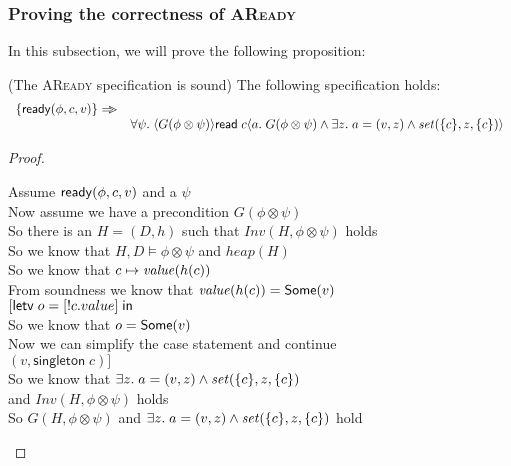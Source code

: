 \subsubsection{Proving the correctness of \textsc{AReady}}

In this subsection, we will prove the following proposition: 

\begin{prop*}{(The \textsc{AReady} specification is sound)}
The following specification holds: 
\begin{displaymath}
\begin{array}{ll}
  \{{\mathsf{ready}({\phi}, {c}, {v})}\} \Rightarrow\!\!\!> \\
& \forall \psi.\; \langle{G(\phi \otimes \psi)}\rangle{\mathsf{read}\;c}\langle{a}.\;{G(\phi \otimes \psi) \land \exists z.\;a = (v, z) \land \mathit{set}(\{{c}\}, z, \{{c}\})}\rangle 
\end{array}
\end{displaymath}
\end{prop*}

\begin{proof}
\begin{tabbedproof}
\oo Assume $\mathsf{ready}({\phi}, {c}, {v})$ and a $\psi$ \\
\ooo Now assume we have a precondition $G(\phi \otimes \psi)$ \\
\ooo So there is an $H = (D,h)$ such that $\mathit{Inv}(H, \phi \otimes \psi)$ holds \\
\ooo So we know that $H, D \models \phi \otimes \psi$ and $\mathit{heap}(H)$ \\
\ooo So we know that $c \mapsto \mathit{value}(h(c))$ \\
\ooo From soundness we know that $\mathit{value}(h(c)) = \mathsf{Some}(v)$ \\
\ooo $[\mathsf{letv}\;o = [!c.value]\;\mathsf{in}\;$ \\
\ooo So we know that $o = \mathsf{Some}(v)$ \\
\ooo Now we can simplify the case statement and continue \\
\ooo $(v, \mathsf{singleton}\;c)]$ \\
\ooo So we know that $\exists z.\;a = (v, z) \land \mathit{set}(\{{c}\}, z, \{{c}\})$ \\
\oox and $\mathit{Inv}(H, \phi \otimes \psi)$ holds \\
\ooo So $G(H, \phi \otimes \psi)$ and $\exists z.\;a = (v, z) \land \mathit{set}(\{{c}\}, z, \{{c}\})$ hold
\end{tabbedproof}
\end{proof}

